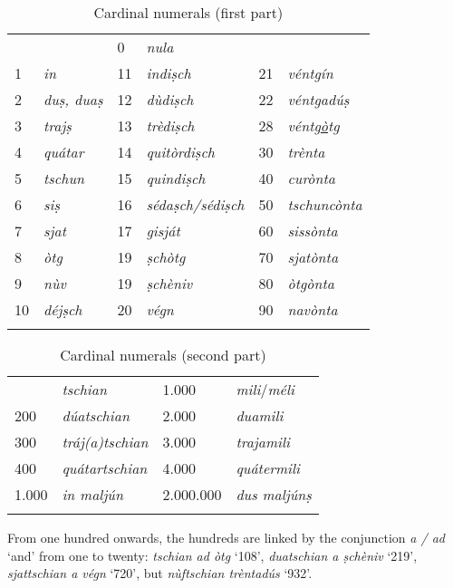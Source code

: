 \begin{table}
\caption{Cardinal numerals (first part)} 
\label{tab:cardnum1}
 \begin{tabular}{llllll}
  \lsptoprule
 &&0&\textit{nula}\\
1&\textit{in}&11&\textit{indiṣch}&21&\textit{véntgín}\\
2&\textit{duṣ, duaṣ}&12&\textit{dùdiṣch}&22&\textit{véntgadúṣ}\\
3&\textit{trajṣ}&13&\textit{trèdiṣch}&28&\textit{véntg\underline{ò}tg}\\
4&\textit{quátar}&14&\textit{quitòrdiṣch}&30 & \textit{trènta}\\
5&\textit{tschun}&15&\textit{quindiṣch} & 40 & \textit{curònta}\\
6&\textit{siṣ}&16&\textit{sédaṣch/sédiṣch}& 50 & \textit{tschuncònta}\\
7&\textit{sjat}&17&\textit{gisját} & 60 & \textit{sissònta}\\
8&\textit{òtg}&19& \textit{ṣchòtg} & 70 & \textit{sjatònta}\\
9&\textit{nùv}&19& \textit{ṣchèniv} & 80 & \textit{òtgònta}\\
10&\textit{déjṣch}&20&\textit{végn} & 90 & \textit{navònta}\\
  \lspbottomrule
 \end{tabular}
\end{table}

\begin{table}
	\caption{Cardinal numerals (second part)} 
	\label{tab:cardnum2}
	\begin{tabular}{llll}
		\lsptoprule
		100&\textit{tschian} & 1.000 & \textit{mili}/\textit{méli}\\
		200&\textit{dúatschian} & 2.000 & \textit{duamili}\\
		300&\textit{tráj(a)tschian} & 3.000 & \textit{trajamili}\\
		400&\textit{quátartschian} & 4.000 &  \textit{quátermili}\\
		1.000 & \textit{in maljún} & 2.000.000 & \textit{dus maljúnṣ}\\
		\lspbottomrule
	\end{tabular}
\end{table}

From one hundred onwards, the hundreds are linked by the conjunction \textit{a / ad} `and' from one to twenty: \textit{tschian ad òtg} `108', \textit{duatschian a ṣchèniv} `219', \textit{sjattschian a végn} `720', but \textit{nùftschian trèntadús} `932'.

